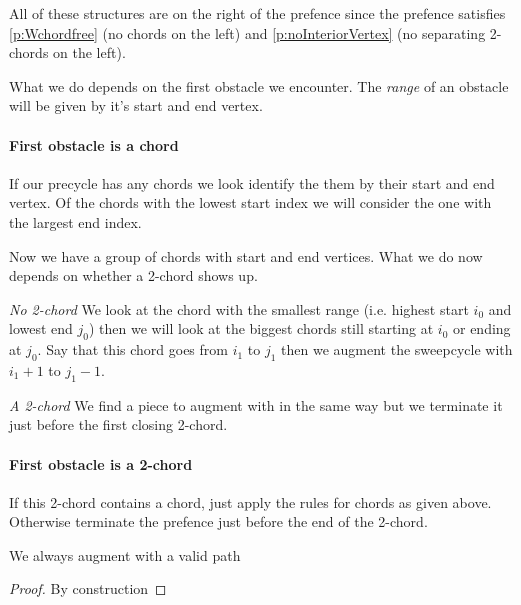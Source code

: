       All of these structures are on the right of the prefence since the prefence satisfies \ref{p:Wchordfree} (no chords on the left) and \ref{p:noInteriorVertex} (no separating 2-chords on the left).

      What we do depends on the first obstacle we encounter. The \emph{range} of an obstacle will be given by it's start and end vertex.

      \paragraph{First obstacle is a chord}
      If our precycle has any chords we look identify the them by their start and end vertex. Of the chords with the lowest start index we will consider the one with the largest end index.

      Now we have a group of chords with start and end vertices. What we do now depends on whether a 2-chord shows up.

      \emph{No 2-chord}
      We look at the chord with the smallest range (i.e. highest start $i_0$ and lowest end $j_0$) then we will look at the biggest chords still starting at $i_0$ or ending at $j_0$. Say that this chord goes from $i_1$ to $j_1$ then we augment the sweepcycle with $i_1 +1$ to $j_1 -1$.

      \emph{A 2-chord}
      We find a piece to augment with in the same way  but we terminate it just before the first closing 2-chord.

      \paragraph{First obstacle is a 2-chord}
      If this 2-chord contains a chord, just apply the rules for chords as given above. Otherwise terminate the prefence just before the end of the 2-chord.


      \begin{lemma}
        \label{lm:}
        We always augment with a valid path
      \end{lemma}
      \begin{proof}
        By construction
      \end{proof}

